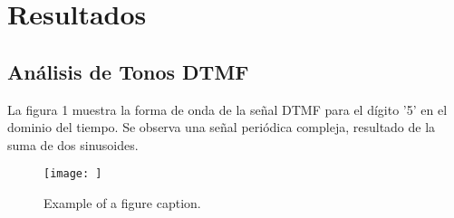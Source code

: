 \documentclass[journal]{IEEEtran} %
\begin{document}



\section{Resultados}

\subsection{Análisis de Tonos DTMF}\label{AA}
La figura 1 muestra la forma de onda de la señal DTMF para el dígito '5' en el dominio del tiempo. Se observa una señal periódica compleja, resultado de la suma de dos sinusoides.
\begin{figure}[htbp]
    \centerline{\texttt{[image: ]}}
    \caption{Example of a figure caption.}
    \label{fig}
\end{figure}
\end{document}
